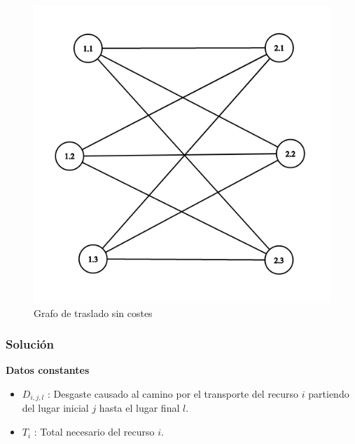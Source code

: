 \documentclass[a4paper,10pt,twocolumn]{article}
\theoremstyle{theorem}
\theoremstyle{definition}
\theoremstyle{remark}
\begin{document}
\begin{figure}[h!]%
	\begin{center}
		\begin{center}
			\includegraphics[scale=.3]{images/graph.png}
		\end{center}
	\caption{Grafo de traslado sin costes}\label{fig:ejer_4_graph}
	\end{center}
\end{figure}


		\subsubsection{Solución}\label{subsubsec:sol_ejer_4}


\textbf{Datos constantes}

\begin{itemize}

\item $D_{i, j, l}$ : Desgaste causado al camino por el transporte del recurso $i$ partiendo del lugar inicial $j$ hasta el lugar final $l$.

\item $T_{i}$ : Total necesario del recurso $i$.

\end{itemize}
\end{document}
